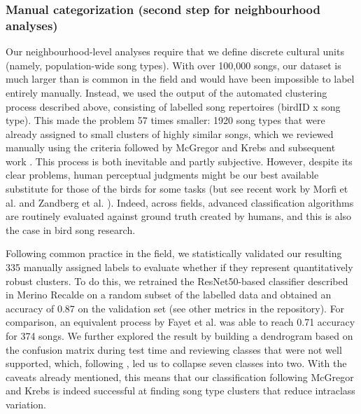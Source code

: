 \documentclass[9pt, onecolumn, twoside, lineno]{gsajnl}
\begin{document}
\subsubsection{Manual categorization (second step for neighbourhood analyses)}
\label{sc:manual-categorization}

Our neighbourhood-level analyses require that we define discrete cultural units (namely, population-wide song types). With over 100,000 songs, our dataset is much larger than is common in the field and would have been impossible to label entirely manually. Instead, we used the output of the automated clustering process described above, consisting of labelled song repertoires (birdID x song type). This made the problem 57 times smaller: 1920 song types that were already assigned to small clusters of highly similar songs, which we reviewed manually using the criteria followed by McGregor and Krebs \autocite{mcgregor1982b, mcgregor1982, mcgregor1981} and subsequent work \autocite{baker1987, falls1982, fayet2014, hutfluss2022}.
This process is both inevitable and partly subjective. However, despite its clear problems, human perceptual judgments might be our best available substitute for those of the birds for some tasks (but see recent work by Morfi et al. \autocite{morfi2021} and  Zandberg et al. \autocite{zandberg2022}). Indeed, across fields, advanced classification algorithms are routinely evaluated against ground truth created by humans, and this is also the case in bird song research.

Following common practice in the field, we statistically validated our resulting 335 manually assigned labels to evaluate whether if they represent quantitatively robust clusters. To do this, we retrained the ResNet50-based classifier described in Merino Recalde \autocite{merinorecalde2023} on a random subset of the labelled data and obtained an accuracy of 0.87 on the validation set (see other metrics in the repository). For comparison, an equivalent process by Fayet et al. \autocite{fayet2014} was able to reach 0.71 accuracy for 374 songs. We further explored the result by building a dendrogram based on the confusion matrix during test time and reviewing classes that were not well supported, which, following  \autocite{fayet2014}, led us to collapse seven classes into two. With the caveats already mentioned, this means that our classification following McGregor and Krebs \autocite{mcgregor1982b} is indeed successful at finding song type clusters that reduce intraclass variation.
\end{document}
